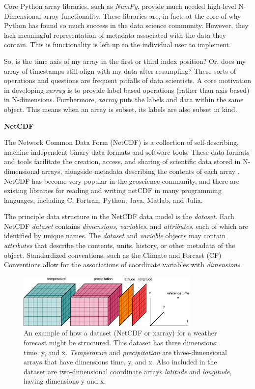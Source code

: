\documentclass{jors}
\begin{document}
Core Python array libraries, such as \textit{NumPy}, provide much needed high-level N-Dimensional array functionality.
These libraries are, in fact, at the core of why Python has found so much success in the data science community.
However, they lack meaningful representation of metadata associated with the data they contain.
This is functionality is left up to the individual user to implement.

So, is the time axis of my array in the first or third index position?
Or, does my array of timestamps still align with my data after resampling?
These sorts of operations and questions are frequent pitfalls of data scientists.
A core motivation in developing \textit{xarray} is to provide label based operations (rather than axis based) in N-dimensions.
Furthermore, \textit{xarray} puts the labels and data within the same object.
This means when an array is subset, its labels are also subset in kind.

\textbf{NetCDF}

The Network Common Data Form (NetCDF) is a collection of self-describing, machine-independent binary data formats and software tools.
These data formats and tools facilitate the creation, access, and sharing of scientific data stored in N-dimensional arrays, alongside metadata describing the contents of each array \citep{Rew_1990}.
NetCDF has become very popular in the geoscience community, and there are existing libraries for reading and writing netCDF in many programming languages, including C, Fortran, Python, Java, Matlab, and Julia.

The principle data structure in the NetCDF data model is the \textit{dataset}.
Each NetCDF \textit{dataset} contains \textit{dimensions}, \textit{variables}, and \textit{attributes}, each of which are identified by unique names.
The \textit{dataset} and \textit{variable} objects may contain \textit{attributes} that describe the contents, units, history, or other metadata of the object.
Standardized conventions, such as the Climate and Forcast (CF) Conventions \citep{eaton2003netcdf} allow for the associations of coordinate variables with \textit{dimensions}.

\begin{figure}
	\centering
	\includegraphics[width=0.8\textwidth]{dataset-diagram_original}
	\caption{An example of how a dataset (NetCDF or xarray) for a weather forecast might be structured.  This dataset has three dimensions: time, y, and x.  \textit{Temperature} and \textit{precipitation} are three-dimensional arrays that have dimensions time, y, and x.  Also included in the dataset are two-dimensional coordinate arrays \textit{latitude} and \textit{longitude}, having dimensions y and x.}
	\label{fig:dataset_diagram}
\end{figure}
\end{document}
